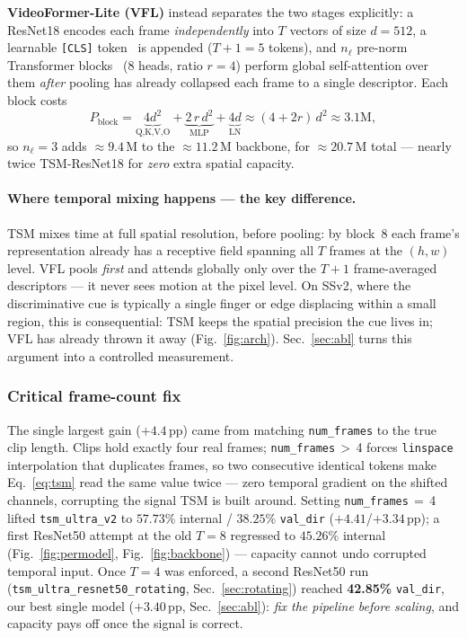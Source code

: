 \documentclass[10pt,twocolumn,letterpaper]{article}
\begin{document}
\noindent\textbf{VideoFormer-Lite (VFL)} instead separates the two stages
explicitly: a ResNet18 encodes each frame \emph{independently} into $T$
vectors of size $d{=}512$, a learnable \texttt{[CLS]}
token~\cite{dosovitskiy2021vit} is appended ($T{+}1{=}5$ tokens), and $n_\ell$
pre-norm Transformer blocks~\cite{xiong2020prenorm} (8 heads, ratio $r{=}4$)
perform global self-attention over them \emph{after} pooling has already
collapsed each frame to a single descriptor. Each block costs
\begin{equation}
  P_{\text{block}} = \underbrace{4d^2}_{\text{Q,K,V,O}} +
  \underbrace{2\,r\,d^2}_{\text{MLP}} + \underbrace{4d}_{\text{LN}}
  \approx (4 + 2r)\,d^2 \approx 3.1\text{M},
  \label{eq:vfl_params}
\end{equation}
so $n_\ell{=}3$ adds ${\approx}9.4$\,M to the ${\approx}11.2$\,M backbone, for
${\approx}20.7$\,M total --- nearly twice TSM-ResNet18 for \emph{zero} extra
spatial capacity.

\paragraph{Where temporal mixing happens --- the key difference.}
TSM mixes time at full spatial resolution, before pooling: by block~8 each
frame's representation already has a receptive field spanning all $T$ frames
at the $(h,w)$ level. VFL pools \emph{first} and attends globally only over
the $T{+}1$ frame-averaged descriptors --- it never sees motion at the pixel
level. On SSv2, where the discriminative cue is typically a single finger or
edge displacing within a small region, this is consequential: TSM keeps the
spatial precision the cue lives in; VFL has already thrown it away
(Fig.~\ref{fig:arch}). Sec.~\ref{sec:abl} turns this argument into a
controlled measurement.

\subsubsection{Critical frame-count fix}
The single largest gain ($+4.4$\,pp) came from matching \texttt{num\_frames}
to the true clip length. Clips hold exactly four real frames;
\texttt{num\_frames}\,$>$\,4 forces \texttt{linspace} interpolation that
duplicates frames, so two consecutive identical tokens make
Eq.~\eqref{eq:tsm} read the same value twice --- zero temporal gradient on the
shifted channels, corrupting the signal TSM is built around. Setting
\texttt{num\_frames}\,$=$\,4 lifted \texttt{tsm\_ultra\_v2} to $57.73\%$
internal / $38.25\%$ \texttt{val\_dir} ($+4.41$/$+3.34$\,pp); a first
ResNet50 attempt at the old $T{=}8$ regressed to $45.26\%$ internal
(Fig.~\ref{fig:permodel}, Fig.~\ref{fig:backbone}) --- capacity cannot undo
corrupted temporal input. Once $T{=}4$ was enforced, a second ResNet50 run
(\texttt{tsm\_ultra\_resnet50\_rotating}, Sec.~\ref{sec:rotating}) reached
\textbf{42.85\%} \texttt{val\_dir}, our best single model
($+3.40$\,pp, Sec.~\ref{sec:abl}): \emph{fix the pipeline before scaling}, and
capacity pays off once the signal is correct.
\end{document}
